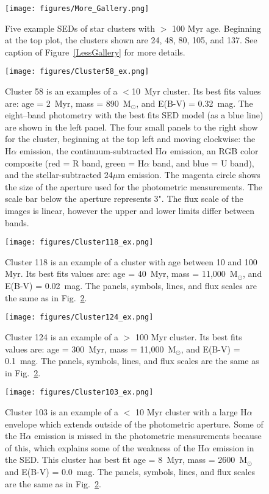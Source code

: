\documentclass{aastex63}
\begin{document}
\begin{figure}[ht]
 \centering
 \texttt{[image: figures/More\_Gallery.png]}
    \caption{Five example SEDs of star clusters with $>$ 100 Myr age. Beginning at the top plot, the clusters shown are 24, 48, 80, 105, and 137. See caption of Figure~\ref{LessGallery} for more details.} 
        \label{MoreGallery}
\end{figure}

\begin{figure}[ht]
 \centering
 \texttt{[image: figures/Cluster58\_ex.png]}
    \caption{Cluster 58 is an examples of a $<$10~Myr cluster. Its best fits values are: 
     age = 2~Myr, mass = 890~M$_{\odot}$, and E(B-V) = 0.32~mag. The eight--band photometry with the best fits SED model (as a blue line) are shown in the left panel. The four small panels to the right show for the cluster, beginning at the top left and moving clockwise: the H$\alpha$ emission, the continuum-subtracted H$\alpha$ emission,  an  RGB color composite (red = R band, green = H$\alpha$ band, and blue = U band), and the stellar-subtracted 24$\mu$m emission. The magenta circle shows the size of the aperture used for the photometric measurements. The scale bar below the aperture represents 3". The flux scale of the images is linear, however the upper and lower limits differ between bands.}
        \label{cluster58_ex}
\end{figure}

\begin{figure}[ht]
 \centering
 \texttt{[image: figures/Cluster118\_ex.png]}
    \caption{Cluster 118 is an example of a cluster with age between 10 and 100 Myr. Its best fits values are: 
     age = 40~Myr, mass = 11,000~M$_{\odot}$, and E(B-V) = 0.02~mag. The panels, symbols, lines, and flux scales are the same as in Fig.~\ref{cluster58_ex}.}
        \label{cluster118_ex}
\end{figure}

\begin{figure}[ht]
 \centering
 \texttt{[image: figures/Cluster124\_ex.png]}
    \caption{Cluster 124 is an example of a $>$ 100 Myr cluster. Its best fits values are: 
     age = 300~Myr, mass = 11,000~M$_{\odot}$, and E(B-V) = 0.1~mag. The panels, symbols, lines, and flux scales are the same as in Fig.~\ref{cluster58_ex}.}
        \label{cluster124_ex}
\end{figure}

\begin{figure}[ht]
 \centering
 \texttt{[image: figures/Cluster103\_ex.png]}
    \caption{Cluster 103 is an example of a $<$ 10 Myr cluster with a large H$\alpha$ envelope which extends outside of the photometric aperture. Some of the H$\alpha$ emission is missed in the photometric measurements because of this, which explains some of the weakness of the H$\alpha$ emission in the SED. This cluster
    has best fit age = 8~Myr, mass = 2600~M$_{\odot}$ and E(B-V) = 0.0~mag. The panels, symbols, lines, and flux scales are the same as in Fig.~\ref{cluster58_ex}.}
        \label{cluster103_ex}
\end{figure}
\end{document}
